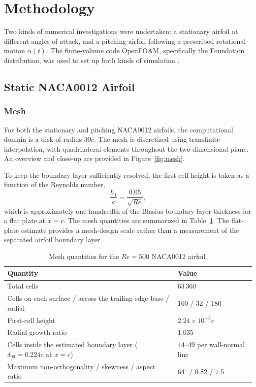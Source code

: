 \section{Methodology}
Two kinds of numerical investigations were undertaken: a stationary airfoil at different angles of attack, and a pitching airfoil following a prescribed rotational motion $\alpha(t)$. The finite-volume code OpenFOAM, specifically the Foundation distribution, was used to set up both kinds of simulation \cite{weller}. 

\subsection{Static NACA0012 Airfoil}
\subsubsection{Mesh}
For both the stationary and pitching NACA0012 airfoils, the computational domain is a disk of radius $30c$. The mesh is discretized using transfinite interpolation, with quadrilateral elements throughout the two-dimensional plane. An overview and close-up are provided in Figure~\ref{fig:mesh}.


To keep the boundary layer sufficiently resolved, the first-cell height is taken as a function of the Reynolds number,
\begin{equation}
\frac{h_1}{c}=\frac{0.05}{\sqrt{Re}},
\end{equation}
which is approximately one hundredth of the Blasius boundary-layer thickness for a flat plate at $x=c$. The mesh quantities are summarized in Table~\ref{tab:mesh}. The flat-plate estimate provides a mesh-design scale rather than a measurement of the separated airfoil boundary layer.

\begin{table}[htbp]\centering\small
\caption{Mesh quantities for the $Re=500$ NACA0012 airfoil.}\label{tab:mesh}
\begin{tabularx}{\linewidth}{@{}>{\raggedright\arraybackslash}p{.57\linewidth}X@{}}
\toprule Quantity & Value \\
\midrule
Total cells & 63\,360 \\
Cells on each surface / across the trailing-edge base / radial & 160 / 32 / 180 \\
First-cell height & $2.24\times10^{-3}c$ \\
Radial growth ratio & 1.035 \\
Cells inside the estimated boundary layer ($\delta_{99}=0.224c$ at $x=c$) & 44--49 per wall-normal line \\
Maximum non-orthogonality / skewness / aspect ratio & $64^\circ$ / 0.82 / 7.5 \\
\bottomrule
\end{tabularx}
\end{table}

